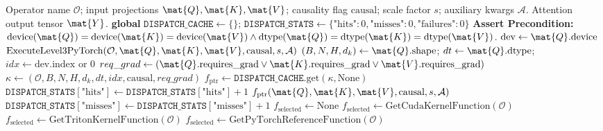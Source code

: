 \begin{algorithm}[H]
\caption[Zero-Overhead 3-Level Fallback Dispatch Controller]{Zero-Overhead 3-Level Fallback Dispatch Controller}
\label{alg:dispatch_controller}
\begin{algorithmic}[1]
\REQUIRE Operator name $\mathcal{O}$; input projections $\mat{Q}, \mat{K}, \mat{V}$; causality flag $\text{causal}$; scale factor $s$; auxiliary kwargs $\mathcal{A}$.
\ENSURE Attention output tensor $\mat{Y}$.
\STATE \textbf{global} $\mathtt{DISPATCH\_CACHE} \leftarrow \{\}$; $\mathtt{DISPATCH\_STATS} \leftarrow \{\text{"hits"}: 0, \text{"misses"}: 0, \text{"failures"}: 0\}$
\STATE \textbf{Assert Precondition:} $\text{device}(\mat{Q}) = \text{device}(\mat{K}) = \text{device}(\mat{V}) \land \text{dtype}(\mat{Q}) = \text{dtype}(\mat{K}) = \text{dtype}(\mat{V})$.
\STATE $\text{dev} \leftarrow \mat{Q}.\text{device}$
    \RETURN $\text{ExecuteLevel3PyTorch}(\mathcal{O}, \mat{Q}, \mat{K}, \mat{V}, \text{causal}, s, \mathcal{A})$ 
\ENDIF
\STATE $(B, N, H, d_k) \leftarrow \mat{Q}.\text{shape}$; $dt \leftarrow \mat{Q}.\text{dtype}$; $idx \leftarrow \text{dev.index} \text{ or } 0$
\STATE $req\_grad \leftarrow (\mat{Q}.\text{requires\_grad} \lor \mat{K}.\text{requires\_grad} \lor \mat{V}.\text{requires\_grad})$
\STATE $\kappa \leftarrow (\mathcal{O}, B, N, H, d_k, dt, idx, \text{causal}, req\_grad)$ 
\STATE $f_{\text{ptr}} \leftarrow \mathtt{DISPATCH\_CACHE}.\text{get}(\kappa, \text{None})$
    \STATE $\mathtt{DISPATCH\_STATS}[\text{"hits"}] \leftarrow \mathtt{DISPATCH\_STATS}[\text{"hits"}] + 1$
    \RETURN $f_{\text{ptr}}(\mat{Q}, \mat{K}, \mat{V}, \text{causal}, s, \mathcal{A})$ 
\ENDIF
\STATE $\mathtt{DISPATCH\_STATS}[\text{"misses"}] \leftarrow \mathtt{DISPATCH\_STATS}[\text{"misses"}] + 1$
\STATE $f_{\text{selected}} \leftarrow \text{None}$
    \STATE $f_{\text{selected}} \leftarrow \text{GetCudaKernelFunction}(\mathcal{O})$ 
\ENDIF
{}
    \STATE $f_{\text{selected}} \leftarrow \text{GetTritonKernelFunction}(\mathcal{O})$ 
\ENDIF
{}
    \STATE $f_{\text{selected}} \leftarrow \text{GetPyTorchReferenceFunction}(\mathcal{O})$ 

\end{algorithmic}
\end{algorithm}
